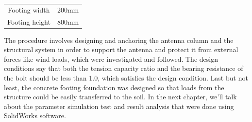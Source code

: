 {\begin{table}[h!]
\begin{tabular}{ c c }
Footing width & 200mm\\

Footing height & 800mm\\
\hline

    \end{tabular}
    \label{tab:3.8}
\end{table}

The procedure involves designing and anchoring the antenna column and the structural system in order to support the antenna and protect it from external forces like wind loads, which were investigated and followed. The design conditions say that both the tension capacity ratio and the bearing resistance of the bolt should be less than 1.0, which satisfies the design condition. Last but not least, the concrete footing foundation was designed so that loads from the structure could be easily transferred to the soil.
In the next chapter, we'll talk about the parameter simulation test and result analysis that were done using SolidWorks software.












}